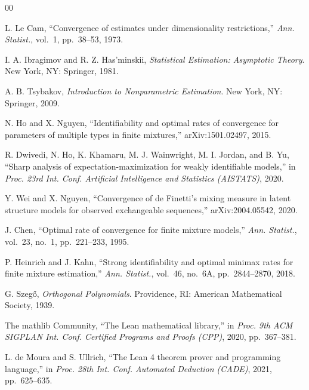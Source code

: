 \documentclass[conference]{IEEEtran}
\theoremstyle{definition}
\begin{document}
\begin{thebibliography}{00}

 L. Le Cam, ``Convergence of estimates under dimensionality
restrictions,'' \emph{Ann. Statist.}, vol.~1, pp.~38--53, 1973.

 I. A. Ibragimov and R. Z. Has'minskii, \emph{Statistical Estimation:
Asymptotic Theory}. New York, NY: Springer, 1981.

 A. B. Tsybakov, \emph{Introduction to Nonparametric Estimation}.
New York, NY: Springer, 2009.

 N. Ho and X. Nguyen, ``Identifiability and optimal rates of convergence
for parameters of multiple types in finite mixtures,'' arXiv:1501.02497, 2015.

 R. Dwivedi, N. Ho, K. Khamaru, M. J. Wainwright, M. I. Jordan, and
B. Yu, ``Sharp analysis of expectation-maximization for weakly identifiable models,'' in
\emph{Proc. 23rd Int. Conf. Artificial Intelligence and Statistics (AISTATS)}, 2020.

 Y. Wei and X. Nguyen, ``Convergence of de Finetti's mixing measure in
latent structure models for observed exchangeable sequences,'' arXiv:2004.05542, 2020.

 J. Chen, ``Optimal rate of convergence for finite mixture models,''
\emph{Ann. Statist.}, vol.~23, no.~1, pp.~221--233, 1995.

 P. Heinrich and J. Kahn, ``Strong identifiability and optimal minimax
rates for finite mixture estimation,'' \emph{Ann. Statist.}, vol.~46, no.~6A,
pp.~2844--2870, 2018.

 G. Szeg\H{o}, \emph{Orthogonal Polynomials}. Providence, RI: American
Mathematical Society, 1939.

 The mathlib Community, ``The Lean mathematical library,'' in
\emph{Proc. 9th ACM SIGPLAN Int. Conf. Certified Programs and Proofs (CPP)}, 2020,
pp.~367--381.

 L. de Moura and S. Ullrich, ``The Lean 4 theorem prover and
programming language,'' in \emph{Proc. 28th Int. Conf. Automated Deduction (CADE)}, 2021,
pp.~625--635.

\end{thebibliography}


\end{document}
